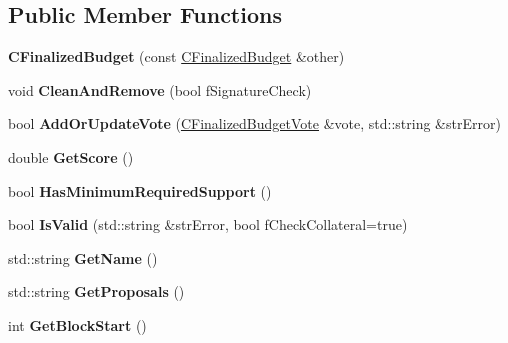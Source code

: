 \subsection*{Public Member Functions}
\begin{DoxyCompactItemize}
\item 
\mbox{\label{class_c_finalized_budget_a701687a3f6f5dadaa8cf20b188306005}} 
{\bfseries C\+Finalized\+Budget} (const \mbox{\hyperlink{class_c_finalized_budget}{C\+Finalized\+Budget}} \&other)
\item 
\mbox{\label{class_c_finalized_budget_a11cbbc4f8f84e5ffb2b7257168da98be}} 
void {\bfseries Clean\+And\+Remove} (bool f\+Signature\+Check)
\item 
\mbox{\label{class_c_finalized_budget_a63fadb286f5d0f9f735bc33deba56b02}} 
bool {\bfseries Add\+Or\+Update\+Vote} (\mbox{\hyperlink{class_c_finalized_budget_vote}{C\+Finalized\+Budget\+Vote}} \&vote, std\+::string \&str\+Error)
\item 
\mbox{\label{class_c_finalized_budget_aadcaaf7b39cfe0400253db00c5fe0b03}} 
double {\bfseries Get\+Score} ()
\item 
\mbox{\label{class_c_finalized_budget_a96b19202f64cb941239a500e7895c048}} 
bool {\bfseries Has\+Minimum\+Required\+Support} ()
\item 
\mbox{\label{class_c_finalized_budget_ae91a3b63f88979a2cf5252b91b9f339d}} 
bool {\bfseries Is\+Valid} (std\+::string \&str\+Error, bool f\+Check\+Collateral=true)
\item 
\mbox{\label{class_c_finalized_budget_adc46e6b0931fd6335d0788311886a1ba}} 
std\+::string {\bfseries Get\+Name} ()
\item 
\mbox{\label{class_c_finalized_budget_a49cb2b919e0de352628d6157cfa1e1c8}} 
std\+::string {\bfseries Get\+Proposals} ()
\item 
\mbox{\label{class_c_finalized_budget_adf320ff0b74a982c0aadc5d8a5e168db}} 
int {\bfseries Get\+Block\+Start} ()

\end{DoxyCompactItemize}
